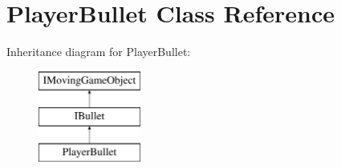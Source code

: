 \hypertarget{class_player_bullet}{}\section{Player\+Bullet Class Reference}
\label{class_player_bullet}
Inheritance diagram for Player\+Bullet\+:\begin{figure}[H]
\begin{center}
\leavevmode
\includegraphics[height=3.000000cm]{class_player_bullet}
\end{center}
\end{figure}
